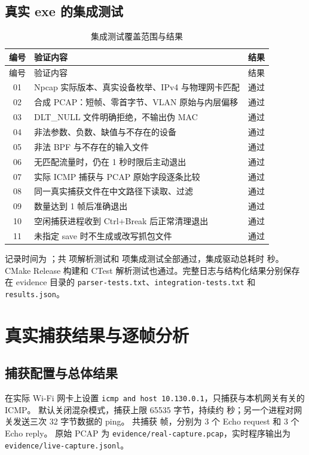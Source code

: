 \documentclass[UTF8,notitlepage,11pt]{ctexart}
\newcommand{\src}[1]{\nolinkurl{#1}}
\begin{document}
\subsection{真实 exe 的集成测试}
\begin{longtable}{c p{}c}
\caption{集成测试覆盖范围与结果}\\\toprule
编号 & 验证内容 & 结果\\\midrule\endfirsthead
\toprule 编号 & 验证内容 & 结果\\\midrule\endhead
01 & Npcap 实际版本、真实设备枚举、IPv4 与物理网卡匹配 & 通过\\
02 & 合成 PCAP：短帧、零首字节、VLAN 原始与内层偏移 & 通过\\
03 & DLT\_NULL 文件明确拒绝，不输出伪 MAC & 通过\\
04 & 非法参数、负数、缺值与不存在的设备 & 通过\\
05 & 非法 BPF 与不存在的输入文件 & 通过\\
06 & 无匹配流量时，仍在 1 秒时限后主动退出 & 通过\\
07 & 实际 ICMP 捕获与 PCAP 原始字段逐条比较 & 通过\\
08 & 同一真实捕获文件在中文路径下读取、过滤 & 通过\\
09 & 数量达到 1 帧后准确退出 & 通过\\
10 & 空闲捕获进程收到 Ctrl+Break 后正常清理退出 & 通过\\
11 & 未指定 save 时不生成或改写抓包文件 & 通过\\\bottomrule
\end{longtable}

记录时间为 \TestTimestamp{}；共 \ParserTests{} 项解析测试和 \IntegrationTests{} 项集成测试全部通过，集成驱动总耗时 \TestDuration{} 秒。
CMake Release 构建和 CTest 解析测试也通过。完整日志与结构化结果分别保存在 evidence 目录的
\src{parser-tests.txt}、\src{integration-tests.txt} 和 \src{results.json}。

\section{真实捕获结果与逐帧分析}\label{sec:analysis}
\subsection{捕获配置与总体结果}
在实际 Wi-Fi 网卡上设置 \src{icmp and host 10.130.0.1}，只捕获与本机网关有关的 ICMP。
默认关闭混杂模式，捕获上限 65535 字节，持续约 \CaptureDuration{} 秒；另一个进程对网关发送三次 32 字节数据的 ping。
共捕获 \PacketCount{} 帧，分别为 3 个 Echo request 和 3 个 Echo reply。
原始 PCAP 为 \src{evidence/real-capture.pcap}，实时程序输出为 \src{evidence/live-capture.jsonl}。
\end{document}
